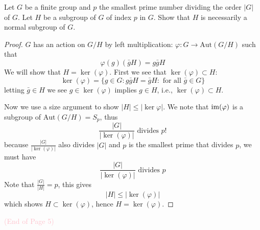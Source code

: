 \begin{prob}[S2001-Q1]
    Let \( G \) be a finite group and \( p \) the smallest prime number dividing the order \( |G| \) of \( G \). Let \( H \) be a subgroup of \( G \) of index \( p \) in \( G \). Show that \( H \) is necessarily a normal subgroup of \( G \).
\end{prob}
\begin{proof}
    $G$ has an action on $G/H$ by left multiplication: $\varphi: G\to\text{Aut}(G/H)$ such that 
    \begin{equation*}
        \varphi(g)(\bar{g}H)=g\bar{g}H
    \end{equation*}
    We will show that $H=\ker(\varphi)$. First we see that $\ker(\varphi)\subset H$: 
    \begin{equation*}
        \ker(\varphi)=\{g\in G: g\bar{g}H=\bar{g}H: \text{ for all }\bar{g}\in G\}
    \end{equation*}
    letting $\bar{g}\in H$ we see $g\in\ker(\varphi)$ implies $g\in H$, i.e., $\ker(\varphi)\subset H$. 

    Now we use a size argument to show $|H|\leq|\ker\varphi|$. We note that $\operatorname{im}(\varphi)$ is a subgroup of $\text{Aut}(G/H)=S_p$, thus 
    \begin{equation*}
        \frac{|G|}{|\ker(\varphi)|}\text{ divides } p!
    \end{equation*}
    because $\frac{|G|}{|\ker(\varphi)|}$ also divides $|G|$ and $p$ is the smallest prime that divides $p$, we must have 
    \begin{equation*}
        \frac{|G|}{|\ker(\varphi)|} \text{ divides } p
    \end{equation*}
    Note that $\frac{|G|}{|H|}=p$, this gives 
    \begin{equation*}
        |H|\leq|\ker(\varphi)|
    \end{equation*}
    which shows $H\subset\ker(\varphi)$, hence $H=\ker(\varphi)$.
\end{proof}




\begin{center}\textcolor{pink}{(End of Page 5)}
\end{center}

